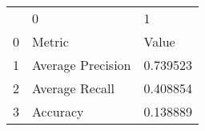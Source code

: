 \begin{tabular}{lll}
 & 0 & 1 \\
0 & Metric & Value \\
1 & Average Precision & 0.739523 \\
2 & Average Recall & 0.408854 \\
3 & Accuracy & 0.138889 \\
\end{tabular}
